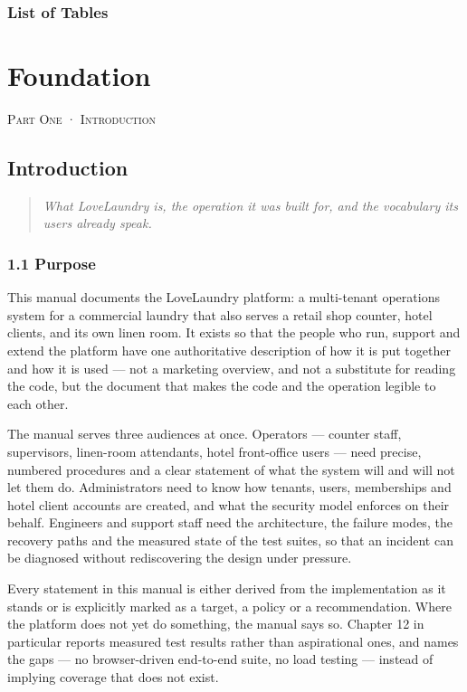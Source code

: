 \documentclass[11pt,a4paper,oneside]{book}
\begin{document}
\section*{List of Tables}
\part{Foundation}
\textsc{\small\color{crimson}Part One · Introduction}\par\medskip
\chapter{Introduction}
\begin{quote}\itshape What LoveLaundry is, the operation it was built for, and the vocabulary its users already speak.\end{quote}
\section{1.1 Purpose}
This manual documents the LoveLaundry platform: a multi-tenant operations system for a commercial laundry that also serves a retail shop counter, hotel clients, and its own linen room. It exists so that the people who run, support and extend the platform have one authoritative description of how it is put together and how it is used — not a marketing overview, and not a substitute for reading the code, but the document that makes the code and the operation legible to each other.

The manual serves three audiences at once. Operators — counter staff, supervisors, linen-room attendants, hotel front-office users — need precise, numbered procedures and a clear statement of what the system will and will not let them do. Administrators need to know how tenants, users, memberships and hotel client accounts are created, and what the security model enforces on their behalf. Engineers and support staff need the architecture, the failure modes, the recovery paths and the measured state of the test suites, so that an incident can be diagnosed without rediscovering the design under pressure.

Every statement in this manual is either derived from the implementation as it stands or is explicitly marked as a target, a policy or a recommendation. Where the platform does not yet do something, the manual says so. Chapter 12 in particular reports measured test results rather than aspirational ones, and names the gaps — no browser-driven end-to-end suite, no load testing — instead of implying coverage that does not exist.
\end{document}
